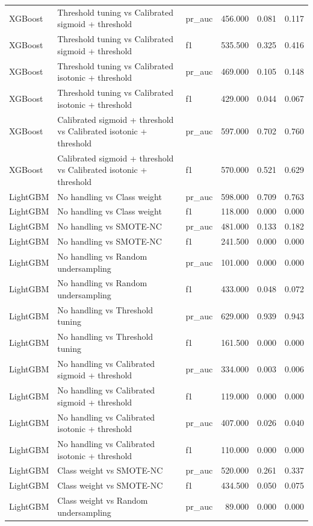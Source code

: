 \begin{tabular}{lllrrr}
XGBoost & Threshold tuning vs Calibrated sigmoid + threshold & pr_auc & 456.000 & 0.081 & 0.117 \\
XGBoost & Threshold tuning vs Calibrated sigmoid + threshold & f1 & 535.500 & 0.325 & 0.416 \\
XGBoost & Threshold tuning vs Calibrated isotonic + threshold & pr_auc & 469.000 & 0.105 & 0.148 \\
XGBoost & Threshold tuning vs Calibrated isotonic + threshold & f1 & 429.000 & 0.044 & 0.067 \\
XGBoost & Calibrated sigmoid + threshold vs Calibrated isotonic + threshold & pr_auc & 597.000 & 0.702 & 0.760 \\
XGBoost & Calibrated sigmoid + threshold vs Calibrated isotonic + threshold & f1 & 570.000 & 0.521 & 0.629 \\
LightGBM & No handling vs Class weight & pr_auc & 598.000 & 0.709 & 0.763 \\
LightGBM & No handling vs Class weight & f1 & 118.000 & 0.000 & 0.000 \\
LightGBM & No handling vs SMOTE-NC & pr_auc & 481.000 & 0.133 & 0.182 \\
LightGBM & No handling vs SMOTE-NC & f1 & 241.500 & 0.000 & 0.000 \\
LightGBM & No handling vs Random undersampling & pr_auc & 101.000 & 0.000 & 0.000 \\
LightGBM & No handling vs Random undersampling & f1 & 433.000 & 0.048 & 0.072 \\
LightGBM & No handling vs Threshold tuning & pr_auc & 629.000 & 0.939 & 0.943 \\
LightGBM & No handling vs Threshold tuning & f1 & 161.500 & 0.000 & 0.000 \\
LightGBM & No handling vs Calibrated sigmoid + threshold & pr_auc & 334.000 & 0.003 & 0.006 \\
LightGBM & No handling vs Calibrated sigmoid + threshold & f1 & 119.000 & 0.000 & 0.000 \\
LightGBM & No handling vs Calibrated isotonic + threshold & pr_auc & 407.000 & 0.026 & 0.040 \\
LightGBM & No handling vs Calibrated isotonic + threshold & f1 & 110.000 & 0.000 & 0.000 \\
LightGBM & Class weight vs SMOTE-NC & pr_auc & 520.000 & 0.261 & 0.337 \\
LightGBM & Class weight vs SMOTE-NC & f1 & 434.500 & 0.050 & 0.075 \\
LightGBM & Class weight vs Random undersampling & pr_auc & 89.000 & 0.000 & 0.000 \\

\end{tabular}
